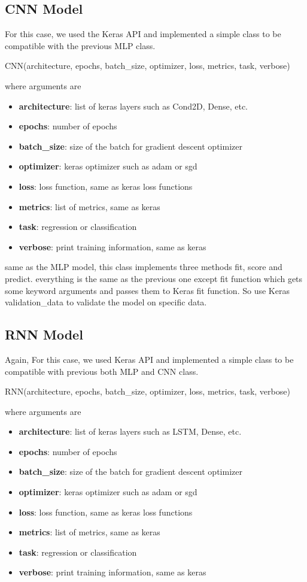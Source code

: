 \documentclass[10pt]{SelfArx} %
\begin{document}
	
	\subsection{CNN Model}
	For this case, we used the Keras API and implemented a simple class to be compatible with the previous MLP class.
	\begin{python}
CNN(architecture, epochs,
batch_size, optimizer, loss,
metrics, task, verbose)
	\end{python}
	where arguments are
	\begin{itemize}
		\item 	\textbf{architecture}: list of keras layers such as Cond2D, Dense, etc.
		\item  \textbf{epochs}: number of epochs
		\item  \textbf{batch\_size}: size of the batch for gradient descent optimizer
		\item  \textbf{optimizer}: keras optimizer such as adam or sgd
		\item  \textbf{loss}: loss function, same as keras loss functions
		\item \textbf{metrics}: list of metrics, same as keras
		\item  \textbf{task}: regression or classification
		\item  \textbf{verbose}: print training information, same as keras
	\end{itemize}
	
	same as the MLP model, this class implements three methods fit, score and predict. everything is the same as the previous one except fit function which gets some keyword arguments and passes them to Keras fit function. So use Keras validation\_data to validate the model on specific data.
	
	\subsection{RNN Model}
	Again, For this case, we used Keras API and implemented a simple class to be compatible with previous both MLP and CNN class.
	\begin{python}
RNN(architecture, epochs,
batch_size, optimizer, loss,
metrics, task, verbose)
	\end{python}
	where arguments are
	\begin{itemize}
		\item 	\textbf{architecture}: list of keras layers such as LSTM, Dense, etc.
		\item  \textbf{epochs}: number of epochs
		\item  \textbf{batch\_size}: size of the batch for gradient descent optimizer
		\item  \textbf{optimizer}: keras optimizer such as adam or sgd
		\item  \textbf{loss}: loss function, same as keras loss functions
		\item \textbf{metrics}: list of metrics, same as keras
		\item  \textbf{task}: regression or classification
		\item  \textbf{verbose}: print training information, same as keras
	\end{itemize}
	
\end{document}
